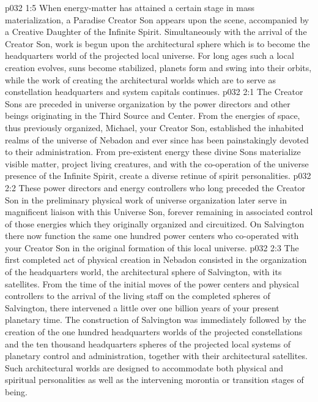 \pc \vs p032 1:5 When energy\hyp{}matter has attained a certain stage in mass materialization, a Paradise Creator Son appears upon the scene, accompanied by a Creative Daughter of the Infinite Spirit. Simultaneously with the arrival of the Creator Son, work is begun upon the architectural sphere which is to become the headquarters world of the projected local universe. For long ages such a local creation evolves, suns become stabilized, planets form and swing into their orbits, while the work of creating the architectural worlds which are to serve as constellation headquarters and system capitals continues.
\vs p032 2:1 The Creator Sons are preceded in universe organization by the power directors and other beings originating in the Third Source and Center. From the energies of space, thus previously organized, Michael, your Creator Son, established the inhabited realms of the universe of Nebadon and ever since has been painstakingly devoted to their administration. From pre\hyp{}existent energy these divine Sons materialize visible matter, project living creatures, and with the co\hyp{}operation of the universe presence of the Infinite Spirit, create a diverse retinue of spirit personalities.
\vs p032 2:2 These power directors and energy controllers who long preceded the Creator Son in the preliminary physical work of universe organization later serve in magnificent liaison with this Universe Son, forever remaining in associated control of those energies which they originally organized and circuitized. On Salvington there now function the same one hundred power centers who co\hyp{}operated with your Creator Son in the original formation of this local universe.
\pc \vs p032 2:3 The first completed act of physical creation in Nebadon consisted in the organization of the headquarters world, the architectural sphere of Salvington, with its satellites. From the time of the initial moves of the power centers and physical controllers to the arrival of the living staff on the completed spheres of Salvington, there intervened a little over one billion years of your present planetary time. The construction of Salvington was immediately followed by the creation of the one hundred headquarters worlds of the projected constellations and the ten thousand headquarters spheres of the projected local systems of planetary control and administration, together with their architectural satellites. Such architectural worlds are designed to accommodate both physical and spiritual personalities as well as the intervening morontia or transition stages of being.
